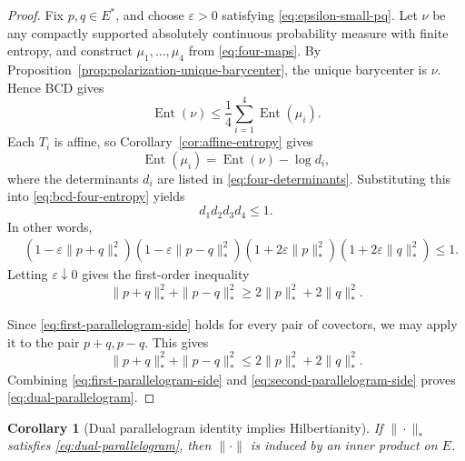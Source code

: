 \documentclass[10pt,a4paper]{amsart}
\numberwithin{equation}{section}
\newtheorem{corollary}[theorem]{Corollary}
\newcommand{\Ent}{\operatorname{Ent}}
\begin{document}
	\begin{proof}
		Fix \(p,q\in E^*\), and choose \(\varepsilon>0\) satisfying
		\eqref{eq:epsilon-small-pq}. Let \(\nu\) be any compactly supported absolutely continuous
		probability measure with finite entropy, and construct \(\mu_1,\dots,\mu_4\) from
		\eqref{eq:four-maps}. By Proposition~\ref{prop:polarization-unique-barycenter}, the unique
		barycenter is \(\nu\). Hence BCD gives
		\begin{equation}\label{eq:bcd-four-entropy}
			\Ent(\nu)
			\le \frac14\sum_{i=1}^4\Ent(\mu_i).
		\end{equation}
		Each \(T_i\) is affine, so Corollary~\ref{cor:affine-entropy} gives
		\[
		\Ent(\mu_i)=\Ent(\nu)-\log d_i,
		\]
		where the determinants \(d_i\) are listed in \eqref{eq:four-determinants}. Substituting
		this into \eqref{eq:bcd-four-entropy} yields
		\begin{equation}\label{eq:product-le-one-first}
			d_1d_2d_3d_4\le1.
		\end{equation}
		In other words,
		\begin{equation}\label{eq:first-product-expanded}
			\begin{aligned}
				&(1-\varepsilon\|p+q\|_*^2)
				(1-\varepsilon\|p-q\|_*^2)
				(1+2\varepsilon\|p\|_*^2)
				(1+2\varepsilon\|q\|_*^2)
				\le1.
			\end{aligned}
		\end{equation}
		Letting \(\varepsilon\downarrow0\) gives the first-order inequality
		\begin{equation}\label{eq:first-parallelogram-side}
			\|p+q\|_*^2+\|p-q\|_*^2
			\ge 2\|p\|_*^2+2\|q\|_*^2.
		\end{equation}
		
		Since \eqref{eq:first-parallelogram-side} holds for every pair of covectors, we may
		apply it to the pair \(p+q,p-q\). This gives
		\begin{equation}\label{eq:second-parallelogram-side}
			\|p+q\|_*^2+\|p-q\|_*^2
			\le 2\|p\|_*^2+2\|q\|_*^2.
		\end{equation}
		Combining \eqref{eq:first-parallelogram-side} and \eqref{eq:second-parallelogram-side}
		proves \eqref{eq:dual-parallelogram}.
	\end{proof}
	
	
	\begin{corollary}[Dual parallelogram identity implies Hilbertianity]
		\label{cor:hilbertianity}
		If \(\|\cdot\|_*\) satisfies \eqref{eq:dual-parallelogram}, then \(\|\cdot\|\) is induced
		by an inner product on \(E\).
	\end{corollary}
	
\end{document}
